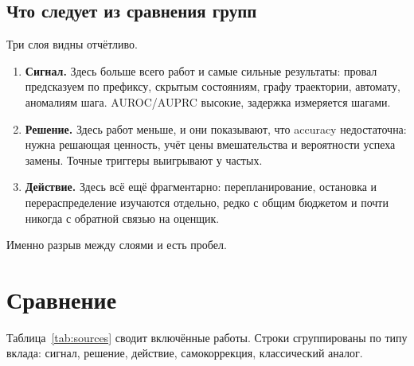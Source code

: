 \documentclass[11pt,a4paper]{article}
\begin{document}
\subsection{Что следует из сравнения групп}

Три слоя видны отчётливо.

\begin{enumerate}
  \item \textbf{Сигнал.} Здесь больше всего работ и самые сильные
        результаты: провал предсказуем по префиксу, скрытым состояниям,
        графу траектории, автомату, аномалиям шага. AUROC/AUPRC высокие,
        задержка измеряется шагами.
  \item \textbf{Решение.} Здесь работ меньше, и они показывают, что
        accuracy недостаточна: нужна решающая ценность, учёт цены
        вмешательства и вероятности успеха замены. Точные триггеры
        выигрывают у частых.
  \item \textbf{Действие.} Здесь всё ещё фрагментарно: перепланирование,
        остановка и перераспределение изучаются отдельно, редко с общим
        бюджетом и почти никогда с обратной связью на оценщик.
\end{enumerate}

Именно разрыв между слоями и есть пробел.

\section{Сравнение}

Таблица~\ref{tab:sources} сводит включённые работы. Строки сгруппированы
по типу вклада: сигнал, решение, действие, самокоррекция, классический
аналог.
\end{document}
